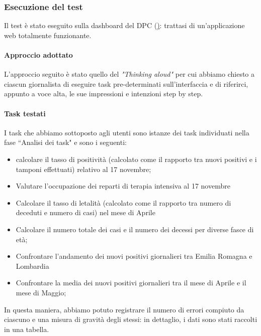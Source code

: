 \subsubsection{Esecuzione del test}
Il test è stato eseguito sulla dashboard del DPC (\href{https://opendatadpc.maps.arcgis.com/apps/opsdashboard/index.html#/b0c68bce2cce478eaac82fe38d4138b1}): trattasi di un'applicazione web totalmente funzionante.
\paragraph{Approccio adottato}
L'approccio seguito è stato quello del \textit{"Thinking aloud"} per cui abbiamo chiesto a ciascun giornalista di eseguire task pre-determinati sull'interfaccia e di riferirci, appunto a voce alta, le sue impressioni e intenzioni step by step.
\paragraph{Task testati}
I task che abbiamo sottoposto agli utenti sono istanze dei task individuati nella fase ``Analisi dei task" e sono i seguenti:
\begin{itemize}
    \item calcolare il tasso di positività (calcolato come il rapporto tra nuovi positivi e i tamponi effettuati) relativo al 17 novembre;
    \item Valutare l'occupazione dei reparti di terapia intensiva al 17 novembre
    \item Calcolare il tasso di letalità (calcolato come il rapporto tra numero di deceduti e numero di casi) nel mese di Aprile
    \item Calcolare il numero totale dei casi e il numero dei decessi per diverse fasce di età;
    \item Confrontare l'andamento dei nuovi positivi giornalieri tra Emilia Romagna e Lombardia
    \item Confrontare la media dei nuovi positivi giornalieri tra il mese di Aprile e il mese di Maggio;
\end{itemize}
In questa maniera, abbiamo potuto registrare il numero di errori compiuto da ciascuno e una misura di gravità degli stessi: in dettaglio, i dati sono stati raccolti in una tabella.

